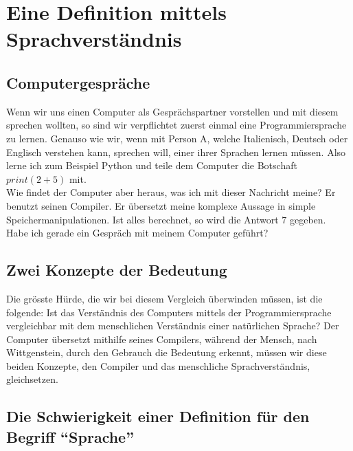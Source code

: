 \documentclass[10pt,a4paper]{article}
\begin{document}
\section{Eine Definition mittels Sprachverständnis}
\subsection{Computergespräche}
Wenn wir uns einen Computer als Gesprächspartner vorstellen und mit diesem sprechen wollten, so sind wir verpflichtet zuerst einmal eine Programmiersprache zu lernen. Genauso wie wir, wenn mit Person A, welche Italienisch, Deutsch oder Englisch verstehen kann, sprechen will, einer ihrer Sprachen lernen müssen. Also lerne ich zum Beispiel Python und teile dem Computer die Botschaft $print(2 + 5)$ mit.  \\
Wie findet der Computer aber heraus, was ich mit dieser Nachricht meine? Er benutzt seinen Compiler. Er übersetzt meine komplexe Aussage in simple Speichermanipulationen. Ist alles berechnet, so wird die Antwort $7$ gegeben. \\ Habe ich gerade ein Gespräch mit meinem Computer geführt?

\subsection{Zwei Konzepte der Bedeutung}
Die grösste Hürde, die wir bei diesem Vergleich überwinden müssen, ist die folgende: Ist das Verständnis des Computers mittels der Programmiersprache vergleichbar mit dem menschlichen Verständnis einer natürlichen Sprache? Der Computer übersetzt mithilfe seines Compilers, während der Mensch, nach Wittgenstein, durch den Gebrauch die Bedeutung erkennt, müssen wir diese beiden Konzepte, den Compiler und das menschliche Sprachverständnis, gleichsetzen.

\subsection{Die Schwierigkeit einer Definition für den Begriff \enquote{Sprache}}
\end{document}
